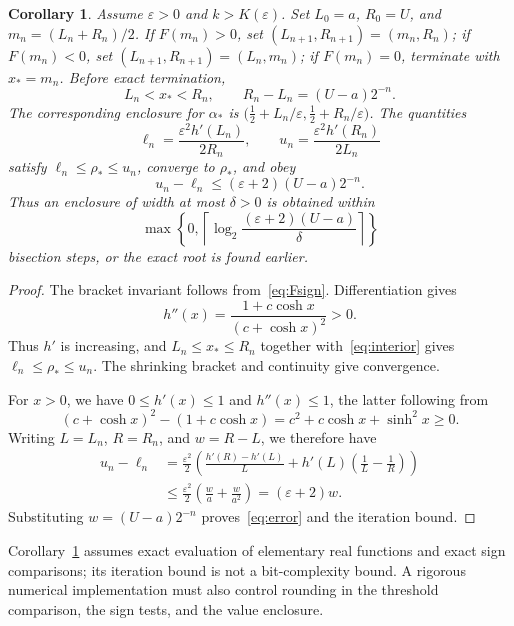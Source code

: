 \documentclass[11pt]{article}
\newtheorem{corollary}{Corollary}
\begin{document}
\begin{corollary}\label{cor:bisection}
Assume $\varepsilon>0$ and $k>K(\varepsilon)$. Set $L_0=a$, $R_0=U$,
and $m_n=(L_n+R_n)/2$. If $F(m_n)>0$, set
$(L_{n+1},R_{n+1})=(m_n,R_n)$; if $F(m_n)<0$, set
$(L_{n+1},R_{n+1})=(L_n,m_n)$; if $F(m_n)=0$, terminate with $x_*=m_n$.
Before exact termination,
\[
 L_n<x_*<R_n,\qquad R_n-L_n=(U-a)2^{-n}.
\]
The corresponding enclosure for $\alpha_*$ is
$\bigl(\tfrac12+L_n/\varepsilon,\tfrac12+R_n/\varepsilon\bigr)$.
The quantities
\begin{equation}\label{eq:valueinterval}
 \ell_n=\frac{\varepsilon^2 h'(L_n)}{2R_n},\qquad
 u_n=\frac{\varepsilon^2 h'(R_n)}{2L_n}
\end{equation}
satisfy $\ell_n\leq\rho_*\leq u_n$, converge to $\rho_*$, and obey
\begin{equation}\label{eq:error}
 u_n-\ell_n\leq(\varepsilon+2)(U-a)2^{-n}.
\end{equation}
Thus an enclosure of width at most $\delta>0$ is obtained within
\[
 \max\left\{0,\left\lceil
 \log_2\frac{(\varepsilon+2)(U-a)}{\delta}
 \right\rceil\right\}
\]
bisection steps, or the exact root is found earlier.
\end{corollary}
\begin{proof}
The bracket invariant follows from~\eqref{eq:Fsign}. Differentiation gives
\[
 h''(x)=\frac{1+c\cosh x}{(c+\cosh x)^2}>0.
\]
Thus $h'$ is increasing, and $L_n\leq x_*\leq R_n$
together with~\eqref{eq:interior} gives $\ell_n\leq\rho_*\leq u_n$.
The shrinking bracket and continuity give convergence.

For $x>0$, we have $0\leq h'(x)\leq1$ and $h''(x)\leq1$, the latter
following from
\[
 (c+\cosh x)^2-(1+c\cosh x)
 =c^2+c\cosh x+\sinh^2x\geq0.
\]
Writing $L=L_n$, $R=R_n$, and $w=R-L$, we therefore have
\begin{align*}
 u_n-\ell_n
 &=\frac{\varepsilon^2}{2}
 \left(\frac{h'(R)-h'(L)}{L}
       +h'(L)\left(\frac1L-\frac1R\right)\right)\\
 &\leq\frac{\varepsilon^2}{2}
 \left(\frac{w}{a}+\frac{w}{a^2}\right)
 =(\varepsilon+2)w.
\end{align*}
Substituting $w=(U-a)2^{-n}$ proves~\eqref{eq:error} and the iteration
bound.
\end{proof}

Corollary~\ref{cor:bisection} assumes exact evaluation of elementary real
functions and exact sign comparisons; its iteration bound is not
a bit-complexity bound. A rigorous numerical implementation
must also control rounding in the threshold comparison, the sign tests,
and the value enclosure.
\end{document}

